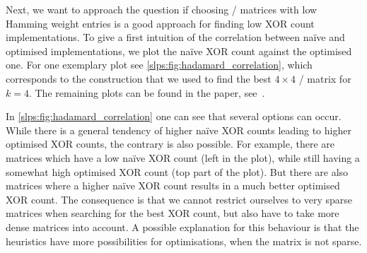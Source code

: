 
Next, we want to approach the question if choosing \MDS/ matrices with low Hamming weight entries is a good approach for finding low XOR count implementations.
To give a first intuition of the correlation between na\"ive and optimised implementations, we plot the na\"ive XOR count against the optimised one.
For one exemplary plot see \cref{slps:fig:hadamard_correlation}, which corresponds to the construction that we used to find the best $4 \times 4$ \MDS/ matrix for $k = 4$.
The remaining plots
can be found in the paper, see~\cite[Appendix~A, Figures~3 to~6]{ToSC:KLSW17}.

In \cref{slps:fig:hadamard_correlation} one can see that several options can occur.
While there is a general tendency of higher na\"ive XOR counts leading to higher optimised XOR counts, the contrary is also possible.
For example, there are matrices which have a low na\"ive XOR count (left in the plot), while still having a somewhat high optimised XOR count (top part of the plot).
But there are also matrices where a higher na\"ive XOR count results in a much better optimised XOR count.
The consequence is that we cannot restrict ourselves to very sparse matrices when searching for the best XOR count, but also have to take more dense matrices into account.
A possible explanation for this behaviour is that the heuristics have more possibilities for optimisations, when the matrix is not sparse.


